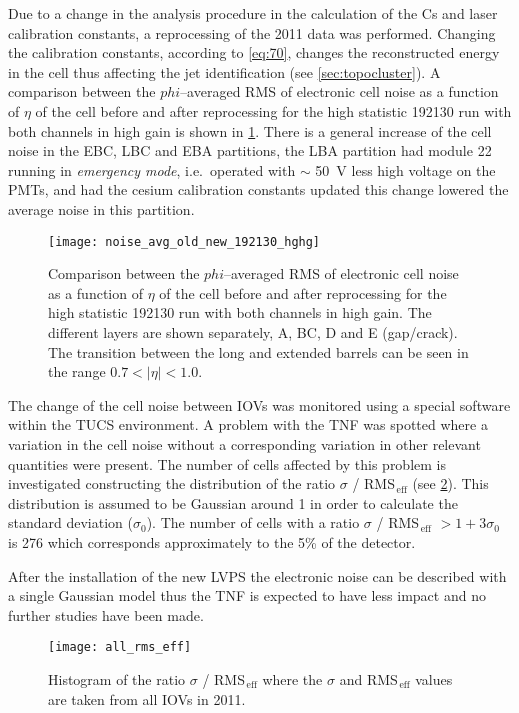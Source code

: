 Due to a change in the analysis procedure in the calculation of the Cs and laser
calibration constants, a reprocessing of the 2011 data was performed. Changing
the calibration constants, according to \cref{eq:70}, changes the reconstructed
energy in the cell thus affecting the jet identification (see
\cref{sec:topocluster}). A comparison between the $phi$--averaged RMS of
electronic cell noise as a function of $\eta$ of the cell before and after
reprocessing for the high statistic 192130 run with both channels in high gain
is shown in \cref{fig:noise_avg_old_new_hghg}. There is a general increase of
the cell noise in the EBC, LBC and EBA partitions, the LBA partition had module
22 running in \emph{emergency mode}, i.e.\ operated with $\sim$ 50~V less high
voltage on the PMTs, and had the cesium calibration constants updated this
change lowered the average noise in this partition.

\begin{figure}[!h]
  \centering
    \texttt{[image: noise\_avg\_old\_new\_192130\_hghg]}
    \caption{Comparison between the $phi$--averaged RMS of electronic cell noise
      as a function of $\eta$ of the cell before and after reprocessing for the
      high statistic 192130 run with both channels in high gain. The different
      layers are shown separately, A, BC, D and E (gap/crack). The transition
      between the long and extended barrels can be seen in the range
      $0.7 < |\eta| < 1.0$.}
    \label{fig:noise_avg_old_new_hghg}
\end{figure}

The change of the cell noise between IOVs was monitored using a special software
within the TUCS environment. A problem with the TNF was spotted where a
variation in the cell noise without a corresponding variation in other relevant
quantities were present. The number of cells affected by this problem is
investigated constructing the distribution of the ratio $\sigma$ /
RMS$_\mathrm{\, eff}$ (see \cref{fig:all_rms_eff}). This distribution is assumed
to be Gaussian around 1 in order to calculate the standard deviation
($\sigma_0$). The number of cells with a ratio $\sigma$ / RMS$_\mathrm{\, eff}$
$> 1 + 3 \sigma_0$ is 276 which corresponds approximately to the 5\% of the
detector.

After the installation of the new LVPS the electronic noise can be described
with a single Gaussian model thus the TNF is expected to have less impact and no
further studies have been made.

\begin{figure}[!h]
  \centering
    \texttt{[image: all\_rms\_eff]}
    \caption{Histogram of the ratio $\sigma$ / RMS$_\mathrm{\, eff}$ where the
      $\sigma$ and RMS$_\mathrm{\, eff}$ values are taken from all IOVs in 2011.}
    \label{fig:all_rms_eff}
\end{figure}
